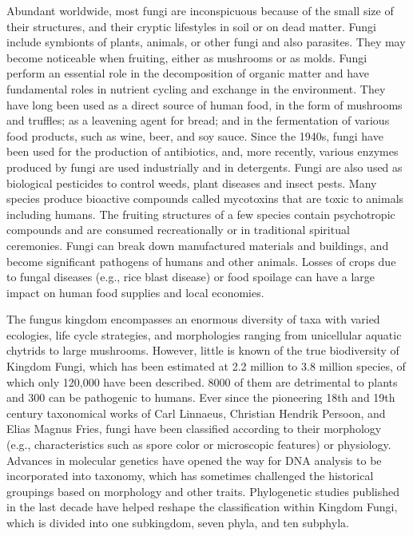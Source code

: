 Abundant worldwide, most fungi are inconspicuous because of the small
size of their structures, and their cryptic lifestyles in soil or on
dead matter. Fungi include symbionts of plants, animals, or other fungi
and also parasites. They may become noticeable when fruiting, either as
mushrooms or as molds. Fungi perform an essential role in the
decomposition of organic matter and have fundamental roles in nutrient
cycling and exchange in the environment. They have long been used as a
direct source of human food, in the form of mushrooms and truffles; as a
leavening agent for bread; and in the fermentation of various food
products, such as wine, beer, and soy sauce. Since the 1940s, fungi have
been used for the production of antibiotics, and, more recently, various
enzymes produced by fungi are used industrially and in detergents. Fungi
are also used as biological pesticides to control weeds, plant diseases
and insect pests. Many species produce bioactive compounds called
mycotoxins that are toxic to animals including humans. The fruiting
structures of a few species contain psychotropic compounds and are
consumed recreationally or in traditional spiritual ceremonies. Fungi
can break down manufactured materials and buildings, and become
significant pathogens of humans and other animals. Losses of crops due
to fungal diseases (e.g., rice blast disease) or food spoilage can have
a large impact on human food supplies and local economies.

The fungus kingdom encompasses an enormous diversity of taxa with varied
ecologies, life cycle strategies, and morphologies ranging from
unicellular aquatic chytrids to large mushrooms. However, little is
known of the true biodiversity of Kingdom Fungi, which has been
estimated at 2.2 million to 3.8 million species, of which only 120,000
have been described. 8000 of them are detrimental to plants and 300 can
be pathogenic to humans. Ever since the pioneering 18th and 19th century
taxonomical works of Carl Linnaeus, Christian Hendrik Persoon, and Elias
Magnus Fries, fungi have been classified according to their morphology
(e.g., characteristics such as spore color or microscopic features) or
physiology. Advances in molecular genetics have opened the way for DNA
analysis to be incorporated into taxonomy, which has sometimes
challenged the historical groupings based on morphology and other
traits. Phylogenetic studies published in the last decade have helped
reshape the classification within Kingdom Fungi, which is divided into
one subkingdom, seven phyla, and ten subphyla.

